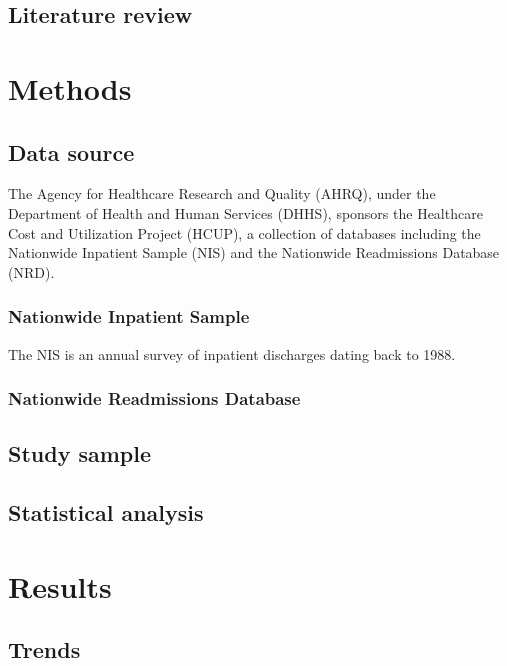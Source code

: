 \documentclass[12pt]{ociamthesis}\usepackage[]{graphicx}\usepackage[]{color}
\begin{document}
\cite{Lamont2017}
\cite{Lessa2015}

\section{Literature review}

\chapter{Methods}


\section{Data source}

The Agency for Healthcare Research and Quality (AHRQ), under the Department of Health and Human Services (DHHS), sponsors the
Healthcare Cost and Utilization Project (HCUP), a collection of databases including the Nationwide Inpatient Sample (NIS) and
the Nationwide Readmissions Database (NRD). \cite{HCUPOverview}

\subsection{Nationwide Inpatient Sample}
The NIS is an annual survey of inpatient discharges dating back to 1988. 

\subsection{Nationwide Readmissions Database}

\section{Study sample}



\section{Statistical analysis}

\chapter{Results}

\section{Trends}
\end{document}
